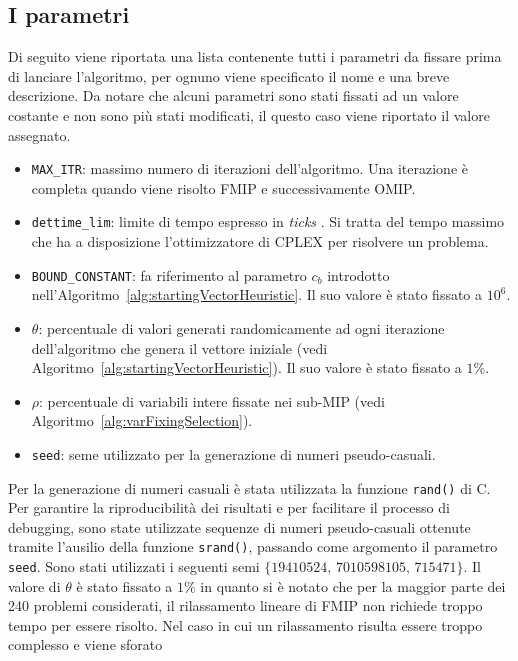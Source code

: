 \subsection{I parametri}%
\label{sub:I parametri}
Di seguito viene riportata una lista contenente tutti i parametri da fissare
prima di lanciare l'algoritmo, per ognuno viene specificato il nome e
una breve descrizione.
Da notare che alcuni parametri sono stati fissati ad un valore costante e non
sono più stati modificati, il questo caso viene riportato il valore assegnato.
\begin{itemize}
    \item \verb|MAX_ITR|: massimo numero di iterazioni dell'algoritmo.
        Una iterazione è completa quando viene risolto FMIP e successivamente
        OMIP.
    \item \verb|dettime_lim|: limite di tempo espresso in \emph{ticks} \cite{ticks}.
        Si tratta del tempo massimo che ha a disposizione l'ottimizzatore di
        CPLEX per risolvere un problema.
    \item \verb|BOUND_CONSTANT|: fa riferimento al parametro $c_b$ introdotto
        nell'Algoritmo~\ref{alg:startingVectorHeuristic}.
        Il suo valore è stato fissato a $10^6$.
    \item $\theta$: percentuale di valori generati randomicamente ad
        ogni iterazione dell'algoritmo che genera il vettore iniziale
        (vedi Algoritmo~\ref{alg:startingVectorHeuristic}).
        Il suo valore è stato fissato a $1\%$.
    \item $\rho$: percentuale di variabili intere fissate nei sub-MIP
        (vedi Algoritmo~\ref{alg:varFixingSelection}).
    \item \verb|seed|: seme utilizzato per la generazione di numeri 
        pseudo-casuali.
\end{itemize}
Per la generazione di numeri casuali è stata utilizzata la funzione
\verb|rand()| di C.
Per garantire la riproducibilità dei risultati e per facilitare il
processo di debugging, sono state utilizzate sequenze di numeri pseudo-casuali
ottenute tramite l'ausilio della funzione \verb|srand()|, passando come
argomento il parametro \verb|seed|.
Sono stati utilizzati i seguenti semi $\{19410524,\, 7010598105,\, 715471\}$.
Il valore di $\theta$ è stato fissato a $1\%$ in quanto si è notato che per
la maggior parte dei 240 problemi considerati, il rilassamento lineare di FMIP
non richiede troppo tempo per essere risolto.
Nel caso in cui un rilassamento risulta essere troppo complesso e viene sforato
